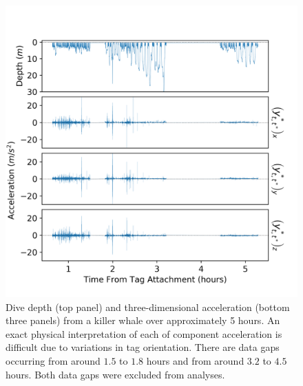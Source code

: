 \begin{figure}[ht]
	\centering
	\includegraphics[width=5.25in]{../Plots/raw_data.png}
	\caption{Dive depth (top panel) and three-dimensional acceleration (bottom three panels) from a killer whale over approximately 5 hours. An exact physical interpretation of each of component acceleration is difficult due to variations in tag orientation. There are data gaps occurring from around $1.5$ to $1.8$ hours and from around $3.2$ to $4.5$ hours. Both data gaps were excluded from analyses.}
	\label{fig:data}
\end{figure}


